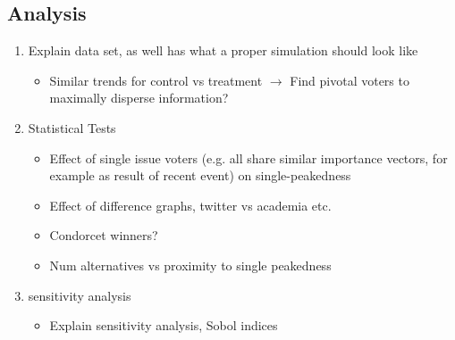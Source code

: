 \subsection{Analysis}
\begin{enumerate}
	\item Explain data set, as well has what a proper simulation should look like
		\begin{itemize}
			\item Similar trends for control vs treatment $\to$ Find pivotal voters to maximally disperse information?
		\end{itemize}

	\item Statistical Tests

		\begin{itemize}
			\item Effect of single issue voters (e.g. all share similar importance vectors, for example as result of recent event) on single-peakedness 
			\item Effect of difference graphs, twitter vs academia etc. 
			\item Condorcet winners? 
			\item Num alternatives vs proximity to single peakedness
		\end{itemize}
	\item sensitivity analysis
		\begin{itemize}
			\item Explain sensitivity analysis, Sobol indices
		\end{itemize}
\end{enumerate}

